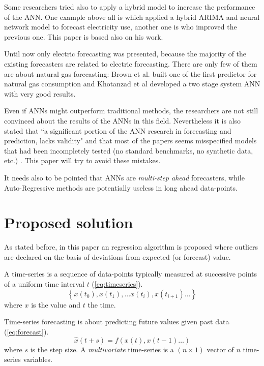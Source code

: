 \documentclass{sig-alternate-sigmod07}
\begin{document}
Some researchers tried also to apply a hybrid model to increase the performance of the ANN. One example above all is \cite{zhang2003time} which applied a hybrid ARIMA and neural network model to forecast electricity use, another one is \cite{khashei2010artificial} who improved the previous one. This paper is based also on his work.

Until now only electric forecasting was presented, because the majority of the existing forecasters are related to electric forecasting. There are only few of them are about natural gas forecasting: Brown et al.\cite{brown1995development} built one of the first predictor for natural gas consumption and Khotanzad et al \cite{khotanzad2000combination} developed a two stage system ANN with very good results.

Even if ANNs might outperform traditional methods, the researchers are not still convinced about the results of the ANNs in this field. Nevertheless it is also stated that ``a significant portion of the ANN research in forecasting and prediction, lacks validity" \cite{adya1998ective} and that most of the papers seems misspecified models that had been incompletely tested (no standard benchmarks, no synthetic data, etc.) \cite{hippert2001neural}. This paper will try to avoid these mistakes.

It needs also to be pointed that ANNs are \emph{multi-step ahead} forecasters, while Auto-Regressive methods are potentially useless in long ahead data-points.


\section{Proposed solution}
\label{sec:proposedSolution}

As stated before, in this paper an regression algorithm is proposed where outliers are declared on the basis of deviations from expected (or forecast) value.

A time-series is a sequence of data-points typically measured at successive points of a uniform time interval $t$ (\cref{eq:timeseries}).
\begin{equation}\label{eq:timeseries}\left\{x(t_0), x(t_1), \ldots x(t_i), x(t_{i+1}) \ldots \right\}\end{equation}
where $x$ is the value and $t$ the time.

Time-series forecasting is about predicting future values given past data (\cref{eq:forecast}). 
\begin{equation}\label{eq:forecast}\hat{x}(t+s) = f\left(x(t), x(t-1) \ldots \right) \end{equation}
where $s$ is the step size. A \emph{multivariate} time-series is a $(n\times1)$ vector of $n$ time-series variables.
\end{document}
